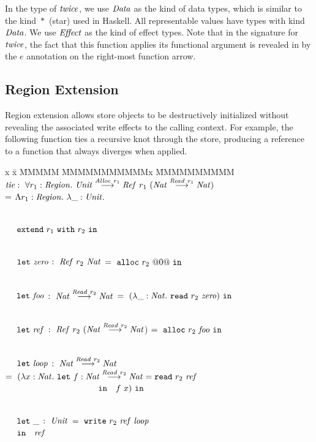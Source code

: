 In the type of $\mathit{twice}$, we use $\mathit{Data}$ as the kind of data types, which is similar to the kind~$*$~(star) used in Haskell. All representable values have types with kind $\mathit{Data}$. We use $\mathit{Effect}$ as the kind of effect types. Note that in the signature for $\mathit{twice}$, the fact that this function applies its functional argument is revealed in by the $e$ annotation on the right-most function arrow.


\subsection{Region Extension}
\label{s:RegionExtension}
Region extension allows store objects to be destructively initialized without revealing the associated write effects to the calling context. For example, the following function ties a recursive knot through the store, producing a reference to a function that always diverges when applied.

\begin{tabbing}
x \= x \= MMMMM \= MMMMMMMMMMMx \= MMMMMMMMMM\kill
\> $\mathit{tie} :~ 
        \forall r_1 : \mathit{Region}
        .~ \mathit{Unit} \stackrel{\mathit{Alloc}~ r_1}{\longrightarrow} \mathit{Ref}~ r_1~ (\mathit{Nat} \stackrel{\mathit{Read}~ r_1}{\longrightarrow} \mathit{Nat})$ \\
\> \> = $\Lambda r_1 : \mathit{Region}
        .~ \lambda \_ : \mathit{Unit}.$               

\\ \> \> ~~ $\texttt{extend}~ r_1~ \texttt{with}~ r_2~ \texttt{in}$     

\\ \> \> ~~ $\texttt{let}~ \mathit{zero}$     \> $:~ \mathit{Ref}~ r_2~ \mathit{Nat}$
                \> $=~ \texttt{alloc}~ r_2~ @0@~ \texttt{in}$

\\ \> \> ~~ $\texttt{let}~ \mathit{foo}$      \> $:~ \mathit{Nat} \stackrel{\mathit{Read}~ r_2}{\longrightarrow} \mathit{Nat}$
                \> $=~ (\lambda \_ : \mathit{Nat}.~ \texttt{read}~ r_2~ \mathit{zero})~ \texttt{in}$

\\ \> \> ~~ $\texttt{let}~ \mathit{ref}$      \> $:~ \mathit{Ref}~ r_2~ (\mathit{Nat} \stackrel{\mathit{Read}~ r_2}{\longrightarrow} \mathit{Nat}$)
                \> $=~ \texttt{alloc}~ r_2~ \mathit{foo}~ \texttt{in}$

\\ \> \> ~~ $\texttt{let}~ \mathit{loop}$     \> $:~ \mathit{Nat} \stackrel{\mathit{Read}~ r_2}{\longrightarrow} \mathit{Nat}$
                \> $=~ (\lambda x : \mathit{Nat}.~
                       \texttt{let}~ f : \mathit{Nat} \stackrel{\mathit{Read}~ r_2}{\longrightarrow} \mathit{Nat} = \texttt{read}~ r_2~ \mathit{ref}$
\\ \> \> \> \> ~~~~~~~~~~~~~~~~~~~~~ $\texttt{in}~~~ f~ x)~ \texttt{in}$

\\ \> \> ~~ $\texttt{let}~ \_$         \> $:~ \mathit{Unit}$             
                \> $=~ \texttt{write}~ r_2~ \mathit{ref}~ \mathit{loop}$ 
\\ \> \> ~~ $\texttt{in}~~~ \mathit{ref}$
\end{tabbing}

